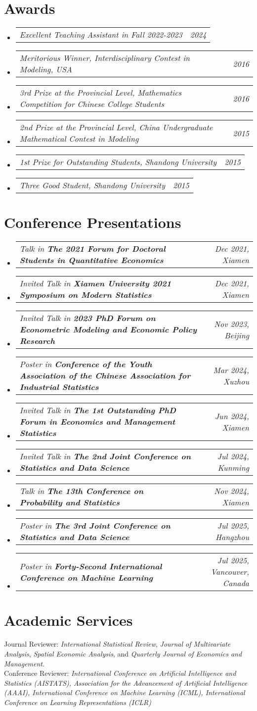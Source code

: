\documentclass[letterpaper,10pt]{article}
\makeatletter
\newcommand{\resumeSubSubheading}[2]{
    \item
    \begin{tabular*}{0.97\textwidth}{l@{\extracolsep{\fill}}r}
      \textit{\small#1} & \textit{\small #2} \\
    \end{tabular*}\vspace{-7pt}
}
\newcommand{\resumeSubHeadingListStart}{\begin{itemize}[leftmargin=0.15in, label={}]}
\newcommand{\resumeSubHeadingListEnd}{\end{itemize}}
\makeatother
\begin{document}
  \section{Awards}
  \resumeSubHeadingListStart
    \resumeSubSubheading
      {Excellent Teaching Assistant in Fall 2022-2023}{2024}
    \resumeSubSubheading
      {Meritorious Winner, Interdisciplinary Contest in Modeling, USA}{2016}
    \resumeSubSubheading
      {3rd Prize at the Provincial Level, Mathematics Competition for Chinese College Students}{2016}
    \resumeSubSubheading
      {2nd Prize at the Provincial Level, China Undergraduate Mathematical Contest in Modeling}{2015}
    \resumeSubSubheading
      {1st Prize for Outstanding Students, Shandong University}{2015}
    \resumeSubSubheading
      {Three Good Student, Shandong University}{2015}
  \resumeSubHeadingListEnd




\section{Conference Presentations}
\resumeSubHeadingListStart
    \resumeSubSubheading
        {Talk in \textbf{The 2021 Forum for Doctoral Students in Quantitative Economics}}{Dec 2021, Xiamen}
    \resumeSubSubheading
        {Invited Talk in \textbf{Xiamen University 2021 Symposium on Modern Statistics}}{Dec 2021, Xiamen}
    \resumeSubSubheading
        {Invited Talk in \textbf{2023 PhD Forum on Econometric Modeling and Economic Policy Research}}{Nov 2023, Beijing}
    \resumeSubSubheading
        {Poster in \textbf{Conference of the Youth Association of the Chinese Association for Industrial Statistics}}{Mar 2024, Xuzhou}
    \resumeSubSubheading
        {Invited Talk in \textbf{The 1st Outstanding PhD Forum in Economics and Management Statistics}}{Jun 2024, Xiamen}
    \resumeSubSubheading
        {Invited Talk in \textbf{The 2nd Joint Conference on Statistics and Data Science}}{Jul 2024, Kunming}
    \resumeSubSubheading
        {Talk in \textbf{The 13th Conference on Probability and Statistics}}{Nov 2024, Xiamen}
    \resumeSubSubheading
        {Poster in \textbf{The 3rd Joint Conference on Statistics and Data Science}}{Jul 2025, Hangzhou}
    \resumeSubSubheading
        {Poster in \textbf{Forty-Second International Conference on Machine Learning}}{Jul 2025, Vancouver, Canada}
\resumeSubHeadingListEnd


  \section{Academic Services}
  Journal Reviewer: \textit{International Statistical Review}, \textit{Journal of Multivariate Analysis}, \textit{Spatial Economic Analysis}, and \textit{Quarterly Journal of Economics and Management}.\\
 Conference Reviewer: \textit{International Conference on Artificial Intelligence and Statistics (AISTATS), Association for the Advancement of Artificial Intelligence (AAAI), International Conference on Machine Learning (ICML), International Conference on Learning Representations (ICLR)}
\end{document}
